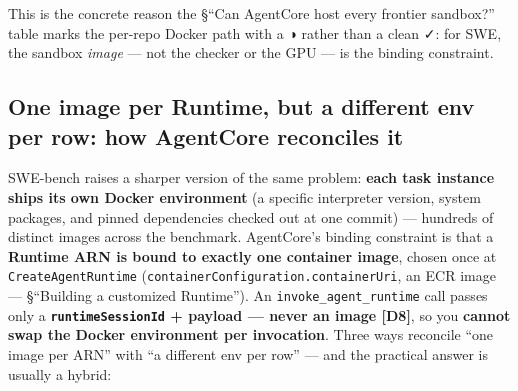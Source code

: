 \documentclass[
  paper=a4,
  ,captions=tableheading
]{scrartcl}
\begin{document}
This is the concrete reason the §``Can AgentCore host every frontier
sandbox?'' table marks the per-repo Docker path with a ◑ rather than a
clean ✓: for SWE, the sandbox \emph{image} --- not the checker or the
GPU --- is the binding constraint.

\hypertarget{one-image-per-runtime-but-a-different-env-per-row-how-agentcore-reconciles-it}{%
\subsection{One image per Runtime, but a different env per row: how
AgentCore reconciles
it}\label{one-image-per-runtime-but-a-different-env-per-row-how-agentcore-reconciles-it}}

SWE-bench raises a sharper version of the same problem: \textbf{each
task instance ships its own Docker environment} (a specific interpreter
version, system packages, and pinned dependencies checked out at one
commit) --- hundreds of distinct images across the benchmark.
AgentCore's binding constraint is that a \textbf{Runtime ARN is bound to
exactly one container image}, chosen once at \texttt{CreateAgentRuntime}
(\texttt{containerConfiguration.containerUri}, an ECR image ---
§``Building a customized Runtime''). An \texttt{invoke\_agent\_runtime}
call passes only a \textbf{\texttt{runtimeSessionId} + payload --- never
an image {[}D8{]}}, so you \textbf{cannot swap the Docker environment
per invocation}. Three ways reconcile ``one image per ARN'' with ``a
different env per row'' --- and the practical answer is usually a
hybrid:
\end{document}
